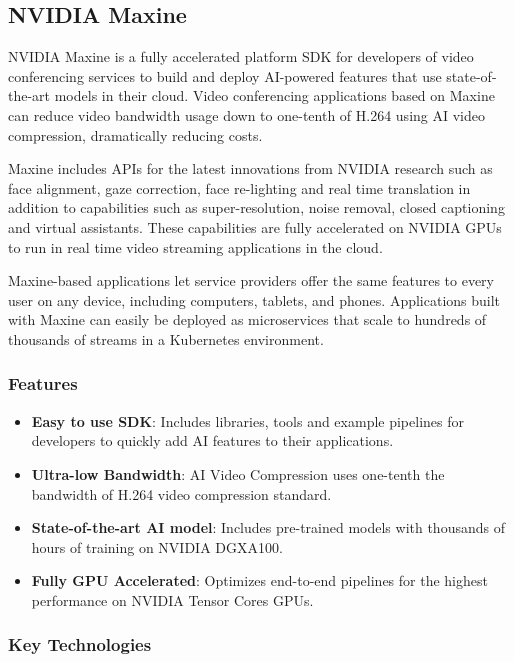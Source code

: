 \subsection{NVIDIA Maxine}

NVIDIA Maxine is a fully accelerated platform SDK for developers of video 
conferencing services to build and deploy AI-powered features that use state-of-the-art 
models in their cloud. Video conferencing applications based on Maxine can reduce video 
bandwidth usage down to one-tenth of H.264 using AI video compression, dramatically reducing costs.

Maxine includes APIs for the latest innovations from NVIDIA research such as face alignment, 
gaze correction, face re-lighting and real time translation in addition to capabilities such 
as super-resolution, noise removal, closed captioning and virtual assistants. These capabilities are 
fully accelerated on NVIDIA GPUs to run in real time video streaming applications in the cloud.

Maxine-based applications let service providers offer the same features to every user on any device,
including computers, tablets, and phones. Applications built with Maxine can easily be deployed as 
microservices that scale to hundreds of thousands of streams in a Kubernetes environment.~\cite{Maxine}

\subsubsection{Features}

\begin{itemize}
    \item \textbf{Easy to use SDK}: Includes libraries, tools and example pipelines 
    for developers to quickly add AI features to their applications.
    \item \textbf{Ultra-low Bandwidth}: AI Video Compression uses one-tenth the 
    bandwidth of H.264 video compression standard.
    \item \textbf{State-of-the-art AI model}: Includes pre-trained models with thousands of hours 
    of training on NVIDIA DGX\texttrademark A100.
    \item \textbf{Fully GPU Accelerated}: Optimizes end-to-end pipelines for the highest performance 
    on NVIDIA Tensor Cores GPUs.
\end{itemize}

\subsubsection{Key Technologies}

